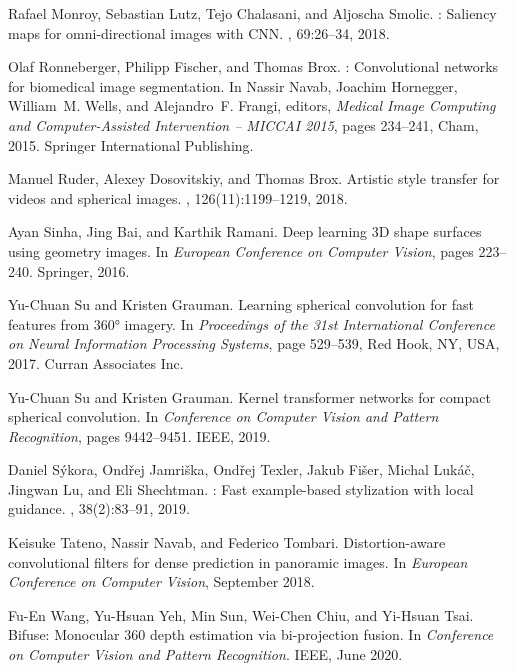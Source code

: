 \documentclass[10pt,twocolumn,letterpaper]{article}
\begin{document}
\begin{thebibliography}{10}
Rafael Monroy, Sebastian Lutz, Tejo Chalasani, and Aljoscha Smolic.
: Saliency maps for omni-directional images with {CNN}.
, 69:26--34, 2018.

Olaf Ronneberger, Philipp Fischer, and Thomas Brox.
: Convolutional networks for biomedical image segmentation.
\newblock In Nassir Navab, Joachim Hornegger, William~M. Wells, and
  Alejandro~F. Frangi, editors, {\em Medical Image Computing and
  Computer-Assisted Intervention -- MICCAI 2015}, pages 234--241, Cham, 2015.
  Springer International Publishing.

Manuel Ruder, Alexey Dosovitskiy, and Thomas Brox.
\newblock Artistic style transfer for videos and spherical images.
, 126(11):1199--1219,
  2018.

Ayan Sinha, Jing Bai, and Karthik Ramani.
\newblock Deep learning {3D} shape surfaces using geometry images.
\newblock In {\em European Conference on Computer Vision}, pages 223--240.
  Springer, 2016.

Yu-Chuan Su and Kristen Grauman.
\newblock Learning spherical convolution for fast features from 360° imagery.
\newblock In {\em Proceedings of the 31st International Conference on Neural
  Information Processing Systems}, page 529–539, Red Hook, NY, USA, 2017.
  Curran Associates Inc.

Yu-Chuan Su and Kristen Grauman.
\newblock Kernel transformer networks for compact spherical convolution.
\newblock In {\em Conference on Computer Vision and Pattern Recognition}, pages
  9442--9451. IEEE, 2019.

Daniel S\'{y}kora, Ond\v{r}ej Jamri\v{s}ka, Ond\v{r}ej Texler, Jakub Fi\v{s}er,
  Michal Luk\'{a}\v{c}, Jingwan Lu, and Eli Shechtman.
: Fast example-based stylization with local guidance.
, 38(2):83--91, 2019.

Keisuke Tateno, Nassir Navab, and Federico Tombari.
\newblock Distortion-aware convolutional filters for dense prediction in
  panoramic images.
\newblock In {\em European Conference on Computer Vision}, September 2018.

Fu-En Wang, Yu-Hsuan Yeh, Min Sun, Wei-Chen Chiu, and Yi-Hsuan Tsai.
\newblock Bifuse: Monocular 360 depth estimation via bi-projection fusion.
\newblock In {\em Conference on Computer Vision and Pattern Recognition}. IEEE,
  June 2020.


\end{thebibliography}
\end{document}
